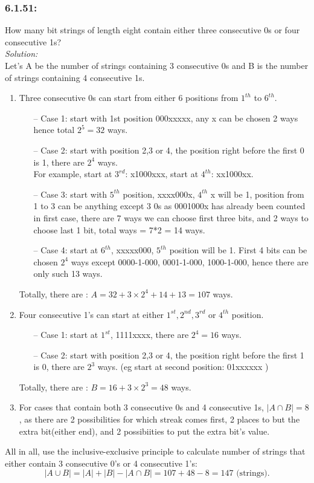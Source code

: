 \documentclass[a4paper]{article}
\begin{document}
\subsubsection*{6.1.51:}How many bit strings of length eight contain either three consecutive 0s or four consecutive 1s?\\
\textit{Solution:} \\
Let's A be the number of strings containing 3 consecutive 0s and B is the number of strings containing 4 consecutive 1s.
\begin{enumerate} 
	\item Three consecutive 0s can start from either 6 positions from $1^{th}$ to $6^{th}$.
	      \begin{itemize} 
		      \item[--] Case 1: start with 1st position 000xxxxx, any x can be chosen 2 ways hence total $2^5=32$ ways.
		      \item[--] Case 2: start with position 2,3 or 4, the position right before the first 0 is 1, there are $2^{4} $ ways. \\
		            For example, start at $3^{rd}$: x1000xxx, start at $4^{th}$: xx1000xx.
		      \item[--] Case 3: start with $5^{th}$ position, xxxx000x, $4^{th}$ x will be 1, position from 1 to 3 can be anything except 3 0s as 0001000x has already been counted in first case, there are 7 ways we can choose first three bits, and 2 ways to choose last 1 bit, total ways = 7*2 = 14 ways.
		      \item[--] Case 4: start at $6^{th}$, xxxxx000, $5^{th}$ position will be 1. First 4 bits can be chosen $2^4$ ways except 0000-1-000, 0001-1-000, 1000-1-000, hence there are only such 13 ways.
	      \end{itemize}
	      Totally, there are : $A= 32 + 3\times 2^{4} + 14+ 13 = 107$ ways.
	\item Four consecutive 1's can start at either $1^{st},2^{nd},3^{rd}$ or $4^{th}$ position.
	      \begin{itemize}
		      \item[--] Case 1: start at $1^{st}$, 1111xxxx, there are $2^4 = 16$ ways.
		      \item[--] Case 2: start with position 2,3 or 4, the position right before the first 1 is 0, there are $2^{3} $ ways. (eg start at second position: 01xxxxxx )
	      \end{itemize}
	      Totally, there are : $B = 16 + 3\times 2^{3} = 48 $ ways.
	\item For cases that contain both 3 consecutive 0s and 4 consecutive 1s, $|A \cap B| = 8$, as there are 2 possibilities for which streak comes first, 2 places to but the extra bit(either end), and 2 possibiities to put the extra bit's value.
\end{enumerate}
All in all, use the inclusive-exclusive principle to calculate number of strings that either contain 3 consecutive 0's or 4 consecutive 1's:
\begin{equation*}
	|A \cup B| = |A| + |B| - |A \cap B| = 107 + 48 - 8 = 147 \text{ (strings).}
\end{equation*}
\end{document}

